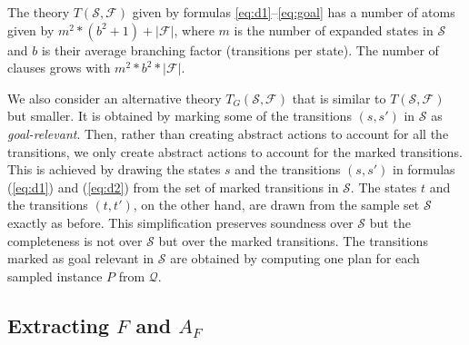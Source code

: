 \documentclass[letterpaper]{article} %
\newcommand{\Omit}[1]{}
\newcommand{\Q}{\mathcal{Q}}
\newcommand{\F}{\mathcal{F}}
\renewcommand{\S}{\mathcal{S}}
\begin{document}
\medskip

The theory $T(\S,\F)$ given by formulas \eqref{eq:d1}--\eqref{eq:goal}
has a number of atoms given by $m^2 * (b^2 + 1) + |\F|$,  where $m$ is the number of expanded
states in $\S$ and $b$ is their average branching factor (transitions per state).
The number of clauses grows with $m^2 * b^2 * |\F|$.
%
\Omit{
This means  that  $50$ expanded states in the sample set
with an average branching factor of $10$, and a set $\F$
with $400$ candidate features, can generate up to $10^8$ clauses.
While this is a loose upper bound for the number of clauses that
follow from the implication   $D_2(s, s', t, t') \Leftharrow\ \textstyle\bigvee_f  selected(f)$
in (\label{eq:d2}) and the numbers are further reduced by symmetry consideration,
this is still a large number. ..
}
%

We also consider an alternative theory $T_G(\S,\F)$ that is similar to $T(\S,\F)$
but  smaller. It is obtained by marking  some of the transitions $(s,s')$ in $\S$  as  \emph{goal-relevant}.
Then, rather than creating abstract  actions to account for all the transitions, we only create
abstract actions to account for the marked transitions. This is achieved by drawing the states
$s$ and the transitions $(s,s')$ in formulas (\ref{eq:d1}) and (\ref{eq:d2}) from the
set of marked transitions in $\S$. The states $t$ and the transitions $(t,t')$, on the other hand,
are drawn from the sample set $\S$ exactly as before. This simplification preserves soundness over $\S$
but the completeness is not over $\S$ but over the marked transitions. 
The   transitions marked as goal relevant in $\S$  are obtained by computing one plan
for each sampled instance $P$ from $\Q$. 

\Omit{
If the set of marked transitions is much smaller than the full sample set, %
$T_G(\S,\F)$ is much smaller than $T(\S,\F)$.
$T_G(\S,\F)$ guarantees soundness relative to $\S$
but completeness only relative to the the subset of goal-relevant transitions in $\S$.
Yet this does not affect the resulting formal guarantees, which depend only on soundness. 
}


\subsection{Extracting $F$ and  $A_F$}
\end{document}
